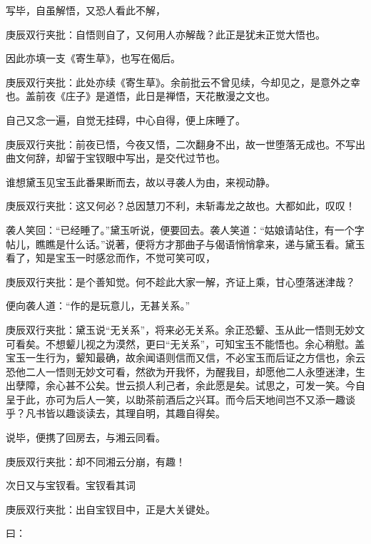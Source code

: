 \begin{parag}

    写毕，自虽解悟，又恐人看此不解，\begin{note}庚辰双行夹批：自悟则自了，又何用人亦解哉？此正是犹未正觉大悟也。\end{note}因此亦填一支《寄生草》，也写在偈后。\begin{note}庚辰双行夹批：此处亦续《寄生草》。余前批云不曾见续，今却见之，是意外之幸也。盖前夜《庄子》是道悟，此日是禅悟，天花散漫之文也。\end{note}自己又念一遍，自觉无挂碍，中心自得，便上床睡了。\begin{note}庚辰双行夹批：前夜已悟，今夜又悟，二次翻身不出，故一世堕落无成也。不写出曲文何辞，却留于宝钗眼中写出，是交代过节也。\end{note}
\end{parag}


\begin{parag}


    谁想黛玉见宝玉此番果断而去，故以寻袭人为由，来视动静。\begin{note}庚辰双行夹批：这又何必？总因慧刀不利，未斩毒龙之故也。大都如此，叹叹！\end{note}袭人笑回：“已经睡了。”黛玉听说，便要回去。袭人笑道：“姑娘请站住，有一个字帖儿，瞧瞧是什么话。”说著，便将方才那曲子与偈语悄悄拿来，递与黛玉看。黛玉看了，知是宝玉一时感忿而作，不觉可笑可叹，\begin{note}庚辰双行夹批：是个善知觉。何不趁此大家一解，齐证上乘，甘心堕落迷津哉？\end{note}便向袭人道：“作的是玩意儿，无甚关系。”\begin{note}庚辰双行夹批：黛玉说“无关系”，将来必无关系。余正恐颦、玉从此一悟则无妙文可看矣。不想颦儿视之为漠然，更曰“无关系”，可知宝玉不能悟也。余心稍慰。盖宝玉一生行为，颦知最确，故余闻语则信而又信，不必宝玉而后证之方信也，余云恐他二人一悟则无妙文可看，然欲为开我怀，为醒我目，却愿他二人永堕迷津，生出孽障，余心甚不公矣。世云损人利己者，余此愿是矣。试思之，可发一笑。今自呈于此，亦可为后人一笑，以助茶前酒后之兴耳。而今后天地间岂不又添一趣谈乎？凡书皆以趣谈读去，其理自明，其趣自得矣。\end{note}说毕，便携了回房去，与湘云同看。\begin{note}庚辰双行夹批：却不同湘云分崩，有趣！\end{note}次日又与宝钗看。宝钗看其词\begin{note}庚辰双行夹批：出自宝钗目中，正是大关键处。\end{note}曰：
\end{parag}


